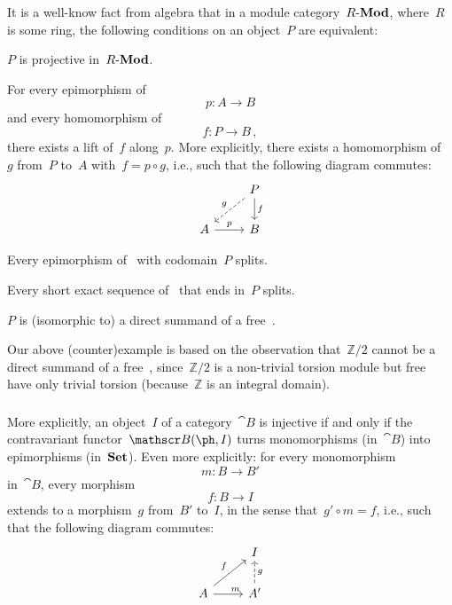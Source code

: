 \begin{remark}
	It is a well-know fact from algebra that in a module category~$R\text{-}\mathbf{Mod}$, where~$R$ is some ring, the following conditions on an object~$P$ are equivalent:
	\begin{equivalenceslist}

		\item
			$P$ is projective in~$R\text{-}\mathbf{Mod}$.

		\item
			For every epimorphism of~
			\[
				p \colon A \to B
			\]
			and every homomorphism of~
			\[
				f \colon P \to B \,,
			\]
			there exists a lift of~$f$ along~$p$.
			More explicitly, there exists a homomorphism of~~$g$ from~$P$ to~$A$ with~$f = p ∘ g$, i.e., such that the following diagram commutes:
			\[
				\begin{tikzcd}
					{}
					&
					P
					\arrow{d}[right]{f}
					\arrow[dashed]{dl}[above left]{g}
					\\
					A
					\arrow{r}[above]{p}
					&
					B
				\end{tikzcd}
			\]

		\item
			Every epimorphism of~ with codomain~$P$ splits.

		\item
			Every short exact sequence of~ that ends in~$P$ splits.

		\item
			$P$ is (isomorphic to) a direct summand of a free~.

	\end{equivalenceslist}

	Our above (counter)example is based on the observation that~$ℤ / 2$ cannot be a direct summand of a free~, since~$ℤ / 2$ is a non-trivial torsion module but free~ have only trivial torsion (because~$ℤ$ is an integral domain).
\end{remark}



\subsubsection{}

More explicitly, an object~$I$ of a category~$\cat{B}$ is injective if and only if the contravariant functor~$\cat{B}(\ph, I)$ turns monomorphisms (in~$\cat{B}$) into epimorphisms (in~$\mathbf{Set}$).
Even more explicitly:
for every monomorphism
\[
	m \colon B \to B'
\]
in~$\cat{B}$, every morphism
\[
	f \colon B \to I
\]
extends to a morphism~$g$ from~$B'$ to~$I$, in the sense that~$g' ∘ m = f$, i.e., such that the following diagram commutes:
\[
	\begin{tikzcd}
		{}
		&
		I
		\\
		A
		\arrow{ur}[above left]{f}
		\arrow{r}[above right]{m}
		&
		A'
		\arrow[dashed]{u}[right]{g}
	\end{tikzcd}
\]

